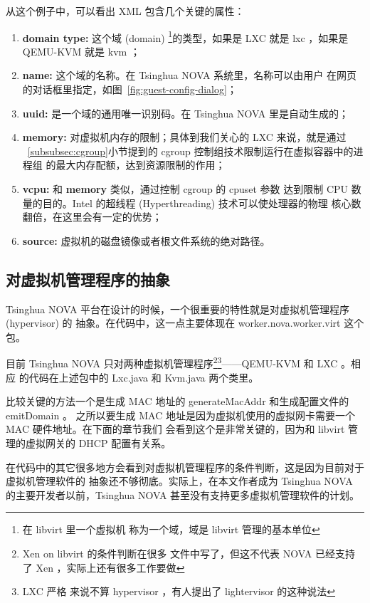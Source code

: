从这个例子中，可以看出 XML 包含几个关键的属性：

\begin{enumerate}
    \item \textbf{domain type:} 这个域 (domain) \footnote{在 libvirt 里一个虚拟机
    称为一个域，域是 libvirt 管理的基本单位}的类型，如果是 LXC 就是 lxc ，如果是
    QEMU-KVM 就是 kvm ；
    \item \textbf{name:} 这个域的名称。在 Tsinghua NOVA 系统里，名称可以由用户
    在网页的对话框里指定，如图~\ref{fig:guest-config-dialog}；
    \item \textbf{uuid:} 是一个域的通用唯一识别码。在 Tsinghua NOVA 里是自动生成的；
    \item \textbf{memory:} 对虚拟机内存的限制；具体到我们关心的 LXC 来说，就是通过
    ~\ref{subsubsec:cgroup}小节提到的 cgroup 控制组技术限制运行在虚拟容器中的进程组
    的最大内存配额，达到资源限制的作用；
    \item \textbf{vcpu:} 和 \textbf{memory} 类似，通过控制 cgroup 的 cpuset 参数
    达到限制 CPU 数量的目的。Intel 的超线程 (Hyperthreading) 技术可以使处理器的物理
    核心数翻倍，在这里会有一定的优势；
    \item \textbf{source:} 虚拟机的磁盘镜像或者根文件系统的绝对路径。
\end{enumerate}

\subsection{对虚拟机管理程序的抽象}

Tsinghua NOVA 平台在设计的时候，一个很重要的特性就是对虚拟机管理程序 (hypervisor) 的
抽象。在代码中，这一点主要体现在 worker.nova.worker.virt 这个包。

目前 Tsinghua NOVA 只对两种虚拟机管理程序\footnote{Xen on libvirt 的条件判断在很多
文件中写了，但这不代表 NOVA 已经支持了 Xen ，实际上还有很多工作要做}\footnote{LXC 严格
来说不算 hypervisor ，有人提出了 lightervisor 的这种说法}——QEMU-KVM 和 LXC 。相应
的代码在上述包中的 Lxc.java 和 Kvm.java 两个类里。

比较关键的方法一个是生成 MAC 地址的 generateMacAddr 和生成配置文件的 emitDomain 。
之所以要生成 MAC 地址是因为虚拟机使用的虚拟网卡需要一个 MAC 硬件地址。在下面的章节我们
会看到这个是非常关键的，因为和 libvirt 管理的虚拟网关的 DHCP 配置有关系。

在代码中的其它很多地方会看到对虚拟机管理程序的条件判断，这是因为目前对于虚拟机管理软件的
抽象还不够彻底。实际上，在本文作者成为 Tsinghua NOVA 的主要开发者以前，Tsinghua NOVA
甚至没有支持更多虚拟机管理软件的计划。

